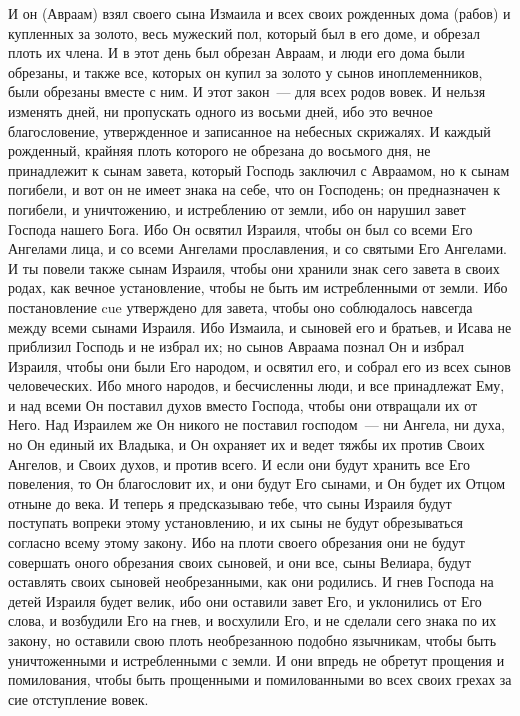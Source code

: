 И он (Авраам) взял своего сына Измаила и всех
своих рожденных дома (рабов) и купленных за
золото, весь мужеский пол, который был в его доме,
и обрезал плоть их члена. И в этот день был
обрезан Авраам, и люди его дома были обрезаны, и
также все, которых он купил за золото у сынов
иноплеменников, были обрезаны вместе с ним. И
этот закон~--- для всех родов вовек. И нельзя
изменять дней, ни пропускать одного из восьми
дней, ибо это вечное благословение, утвержденное
и записанное на небесных скрижалях. И каждый
рожденный, крайняя плоть которого не обрезана до
восьмого дня, не принадлежит к сынам завета,
который Господь заключил с Авраамом, но к сынам
погибели, и вот он не имеет знака на себе, что он
Господень; он предназначен к погибели, и
уничтожению, и истреблению от земли, ибо он
нарушил завет Господа нашего Бога. Ибо Он освятил
Израиля, чтобы он был со всеми Его Ангелами лица,
и со всеми Ангелами прославления, и со святыми
Его Ангелами. И ты повели также сынам Израиля,
чтобы они хранили знак сего завета в своих родах,
как вечное установление, чтобы не быть им
истребленными от земли. Ибо постановление cue
утверждено для завета, чтобы оно соблюдалось
навсегда между всеми сынами Израиля. Ибо Измаила,
и сыновей его и братьев, и Исава не приблизил
Господь и не избрал их; но сынов Авраама познал Он
и избрал Израиля, чтобы они были Его народом, и
освятил его, и собрал его из всех сынов
человеческих. Ибо много народов, и бесчисленны
люди, и все принадлежат Ему, и над всеми Он
поставил духов вместо Господа, чтобы они
отвращали их от Него. Над Израилем же Он никого не
поставил господом~--- ни Ангела, ни духа, но Он
единый их Владыка, и Он охраняет их и ведет тяжбы
их против Своих Ангелов, и Своих духов, и против
всего. И если они будут хранить все Его повеления,
то Он благословит их, и они будут Его сынами, и Он
будет их Отцом отныне до века. И теперь я
предсказываю тебе, что сыны Израиля будут
поступать вопреки этому установлению, и их сыны
не будут обрезываться согласно всему этому
закону. Ибо на плоти своего обрезания они не
будут совершать оного обрезания своих сыновей, и
они все, сыны Велиара, будут оставлять своих
сыновей необрезанными, как они родились. И гнев
Господа на детей Израиля будет велик, ибо они
оставили завет Его, и уклонились от Его слова, и
возбудили Его на гнев, и восхулили Его, и не
сделали сего знака по их закону, но оставили свою
плоть необрезанною подобно язычникам, чтобы
быть уничтоженными и истребленными с земли. И они
впредь не обретут прощения и помилования, чтобы
быть прощенными и помилованными во всех своих
грехах за сие отступление вовек.

